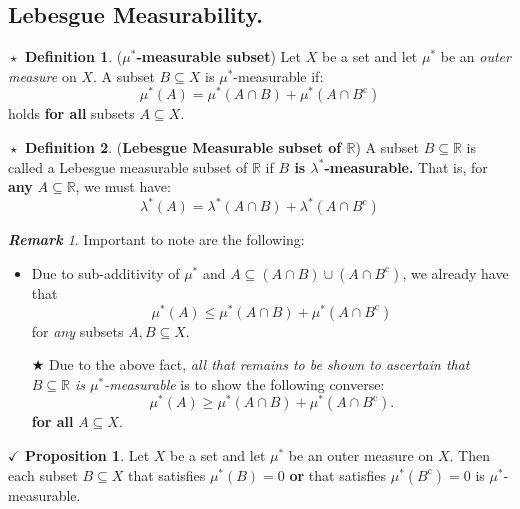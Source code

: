 \documentclass{article}
\theoremstyle{definition}
\newtheorem{definition}{$\boxed{\star}$ Definition}
\theoremstyle{remark}
\newtheorem*{remark}{\textbf{Remark}}
\theoremstyle{definition}
\theoremstyle{definition}
\newtheorem{proposition}{$\checkmark$ Proposition}
\theoremstyle{definition}
\newcommand{\union}{\cup}
\newcommand{\intrs}{\cap}
\newcommand{\R}{\mathbb{R}}
\newcommand{\comp}[1]{#1^{\text{c}}}
\newcommand{\om}[1]{\mu^*\left ( #1\right )}
\newcommand{\lom}[1]{\lambda^*\left (#1\right )}
\begin{document}
\subsection{Lebesgue Measurability.}
\begin{definition}
	(\textbf{$ \mu^* $-measurable subset}) Let $ X $ be a set and let $ \mu^* $ be an \emph{outer measure} on $ X $. A subset $ B\subseteq X $ is $ \mu^* $-measurable if: 
	\[\om{A} = \om{A\intrs B} + \om{A\intrs \comp{B}}\]
	holds \textbf{for all} subsets $ A \subseteq X$.
\end{definition}
\hrulefill
\begin{definition}
	(\textbf{Lebesgue Measurable subset of $ \R $}) A subset $ B\subseteq \R $ is called a Lebesgue measurable subset of $ \R $ if \textbf{$ B $ is $ \lambda^* $-measurable.} That is, for \textbf{any} $ A\subseteq \R $, we must have:
	\[\lom{A} = \lom{A\intrs B} + \lom{A\intrs \comp{B}}\]
\end{definition}
\begin{remark}
	Important to note are the following:
	\begin{itemize}
		\item {Due to sub-additivity of $ \mu^* $ and $ A \subseteq (A\intrs B) \union (A\intrs \comp{B}) $, we already have that 
	\[\om{A} \le  \om{A\intrs B} + \om{A\intrs \comp{B}}\]	
for \emph{any} subsets $ A,B\subseteq X $.	
}
\item[$ \bigstar $]{Due to the above fact, \emph{all that remains to be shown to ascertain that $ B\subseteq \R $ is $ \mu^* $-measurable} is to show the following converse:
\[\om{A}\ge \om{A\intrs B} + \om{A\intrs \comp{B}}.\]
\textbf{for all} $ A\subseteq X $.
}
	\end{itemize}
\end{remark}
\hrulefill
\begin{proposition}
	\label{P-10}
	Let $ X $ be a set and let $ \mu^* $ be an outer measure on $ X $. Then each subset $ B\subseteq X $ that satisfies $ \om{B} = 0 $ \textbf{or} that satisfies $ \om{\comp{B}} = 0 $ is $ \mu^* $-measurable.
\end{proposition}
\end{document}
